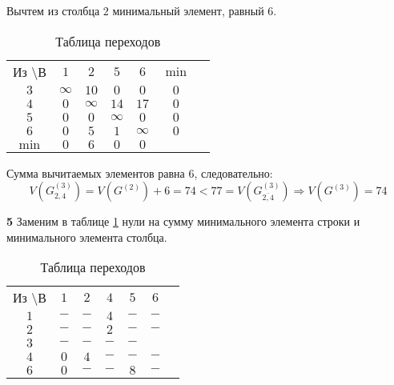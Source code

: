 Вычтем из столбца $2$ минимальный элемент, равный $6$.

\begin{table}[H]
\begin{center}
	\def\tabcolsep{15pt}
	\caption{Таблица переходов}
	\label{tab:24}
	\begin{tabular}{|c||c|c|c|c|c|c|}
		\hline
		Из \textbackslash В & $1$ & $2$ & $5$ & $6$ & $\min$ \\
		\hhline{|=#=|=|=|=|=|}
		$3$ & $\infty$ & $10$ & $0$ & $0$ & $0$  \\ 
		\hline
		$4$ & $0$ & $\infty$ & $14$ & $17$ & $0$  \\
		\hline
		$5$ & $0$ & $0$ & $\infty$ & $0$ & $0$  \\
		\hline
		$6$ & $0$ & $5$ & $1$ & $\infty$ & $0$  \\ 
		\hhline{|=#=|=|=|=|=|}
		$\min$ & $0$ & $6$ & $0$ & $0$ & \\
		\hline 
	\end{tabular}
\end{center}
\end{table}

Сумма вычитаемых элементов равна $6$, следовательно:
\begin{equation*}
V(G_{2,4}^{(3)}) = V(G^{(2)}) + 6 = 74 < 77 = V(G_{\overline{2,4}}^{(3)}) \Rightarrow V(G^{(3)}) = 74
\end{equation*}

\textbf{5} Заменим в таблице \ref{tab:24} нули на сумму минимального элемента строки и минимального элемента столбца.

\begin{table}[H]
\begin{center}
	\def\tabcolsep{15pt}
	\caption{Таблица переходов}
	\label{tab:25}
	\begin{tabular}{|c||c|c|c|c|c|c|}
		\hline
		Из \textbackslash В & $1$ & $2$ & $4$ & $5$ & $6$ \\
		\hhline{|=#=|=|=|=|=|}
		$1$ & $-$ & $-$ & $4$ & $-$ & $-$ \\
		\hline
		$2$ & $-$ & $-$ & $2$ & $-$ & $-$ \\
		\hline
		$3$ & $-$ & $-$ & $-$ & $-$ & \redbold{$12$} \\ 
		\hline
		$4$ & $0$ & $4$ & $-$ & $-$ & $-$ \\
		\hline
		$6$ & $0$ & $-$ & $-$ & $8$ & $-$ \\
		\hline
	\end{tabular}
\end{center}
\end{table}

